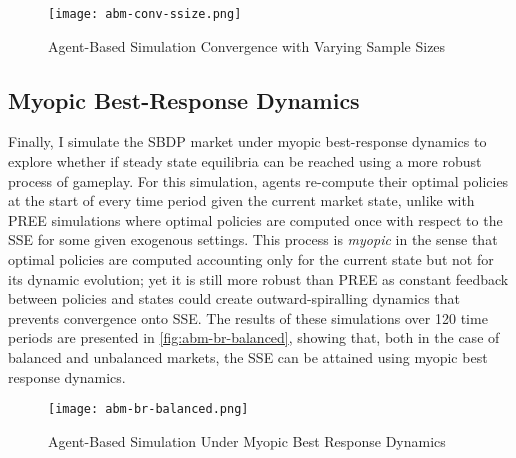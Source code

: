 \begin{figure}[ht] 
    \centering
    \caption{Agent-Based Simulation Convergence with Varying Sample Sizes}
    \texttt{[image: abm-conv-ssize.png]}
    \label{fig:abm-conv-ssize}
\end{figure} 

\subsection{Myopic Best-Response Dynamics}
Finally, I simulate the SBDP market under myopic best-response dynamics to explore whether if steady state equilibria can be reached using a more robust process of gameplay. For this simulation, agents re-compute their optimal policies at the start of every time period given the current market state, unlike with PREE simulations where optimal policies are computed once with respect to the SSE for some given exogenous settings. This process is \textit{myopic} in the sense that optimal policies are computed accounting only for the current state but not for its dynamic evolution; yet it is still more robust than PREE as constant feedback between policies and states could create outward-spiralling dynamics that prevents convergence onto SSE. The results of these simulations over 120 time periods are presented in \autoref{fig:abm-br-balanced}, showing that, both in the case of balanced and unbalanced markets, the SSE can be attained using myopic best response dynamics.

\begin{figure}[ht] 
    \centering
    \caption{Agent-Based Simulation Under Myopic Best Response Dynamics}
    \texttt{[image: abm-br-balanced.png]}
    \label{fig:abm-br-balanced}
\end{figure}  


